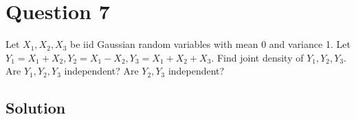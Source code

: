 \section*{Question 7}

Let \( X_{1}, X_{2}, X_{3} \) be iid Gaussian random variables with mean 0 and variance 1.
Let \( Y_{1}=X_{1}+X_{2}, Y_{2}=X_{1}-X_{2}, Y_{3}=X_{1}+X_{2}+X_{3} \).
Find joint density of \( Y_{1}, Y_{2}, Y_{3} \).
Are \( Y_{1}, Y_{2}, Y_{3} \) independent?
Are \( Y_{2}, Y_{3} \) independent?

\subsection*{Solution}
